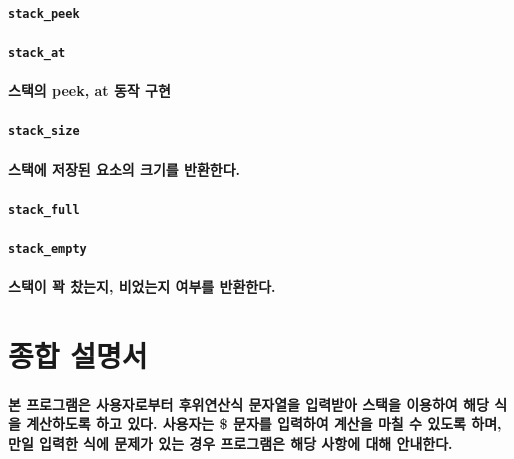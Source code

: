 \documentclass[UTF8]{report}
\begin{document}
            \paragraph{\texttt{stack\_peek}}
            \paragraph{\texttt{stack\_at}}
            \paragraph{%
                \normalfont 스택의 peek, at 동작 구현
            }

            \paragraph{\texttt{stack\_size}}
            \paragraph{%
                \normalfont 스택에 저장된 요소의 크기를 반환한다.
            }

            \paragraph{\texttt{stack\_full}}
            \paragraph{\texttt{stack\_empty}}
            \paragraph{%
                \normalfont 스택이 꽉 찼는지, 비었는지 여부를 반환한다.
            }

        \section{종합 설명서}

            \paragraph{%
                \normalfont 본 프로그램은 사용자로부터 후위연산식 문자열을 입력받아 스택을 이용하여 해당 식을 계산하도록 하고 있다. 사용자는 \$ 문자를 입력하여 계산을 마칠 수 있도록 하며, 만일 입력한 식에 문제가 있는 경우 프로그램은 해당 사항에 대해 안내한다.
            }
\end{document}
